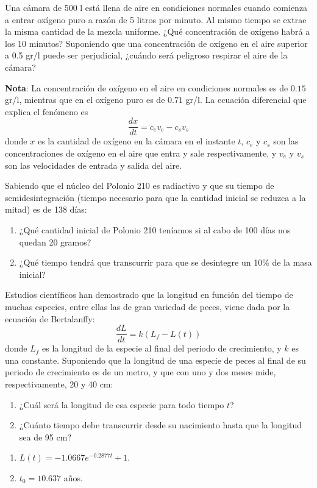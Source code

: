 {Una cámara de 500 l está llena de aire en condiciones normales
cuando comienza a entrar oxí­geno puro a razón de 5 litros por minuto.
Al mismo tiempo se extrae la misma cantidad de la mezcla uniforme. ¿Qué
concentración de oxí­geno habrá a los 10 minutos? Suponiendo que una
concentración de oxí­geno en el aire superior a 0.5 gr/l puede ser perjudicial,
¿cuándo será peligroso respirar el aire de la cámara?

\textbf{Nota}: La concentración de oxí­geno en el aire en condiciones normales es
de $0.15$ gr/l, mientras que en el oxí­geno puro es de $0.71$ gr/l. La ecuación
diferencial que explica el fenómeno es
\[
\frac{dx}{dt}=c_ev_e-c_sv_s
\]
donde $x$ es la cantidad de oxí­geno en la cámara en el instante $t$, $c_e$ y
$c_s$ son las concentraciones de oxí­geno en el aire que entra y sale
respectivamente, y $v_e$ y $v_s$ son las velocidades de entrada y salida del
aire.
}
{
}
{}



{Sabiendo que el núcleo del Polonio 210 es radiactivo y que su tiempo de semidesintegración (tiempo necesario para que
la cantidad inicial se reduzca a la mitad) es de 138 días:
\begin{enumerate}
\item ¿Qué cantidad inicial de Polonio 210 teníamos si al cabo de 100 días nos quedan 20 gramos?

\item ¿Qué tiempo tendrá que transcurrir para que se desintegre un 10\% de la masa inicial?
\end{enumerate}
}
{
}
{}


{Estudios científicos han demostrado que la longitud en función
del tiempo de muchas especies, entre ellas las de gran variedad de
peces, viene dada por la ecuación de Bertalanffy:
\[
\frac{{dL}}{{dt}} = k\left( {L_f  - L(t)} \right)
\]
donde $L_f$ es la longitud de la especie al final del periodo de
crecimiento, y $k$ es una constante. Suponiendo que la longitud de
una especie de peces al final de su periodo de crecimiento es de un
metro, y que con uno y dos meses mide, respectivamente, 20 y 40 cm:
\begin{enumerate}
\item ¿Cuál será la longitud de esa especie para todo tiempo $t$?
\item ¿Cuánto tiempo debe transcurrir desde su nacimiento hasta que la longitud sea de 95 cm?
\end{enumerate}
}
{\begin{enumerate}
\item $L(t)=-1.0667e^{-0.2877t}+1$.
\item $t_0=10.637$ años.
\end{enumerate}
}
{}


